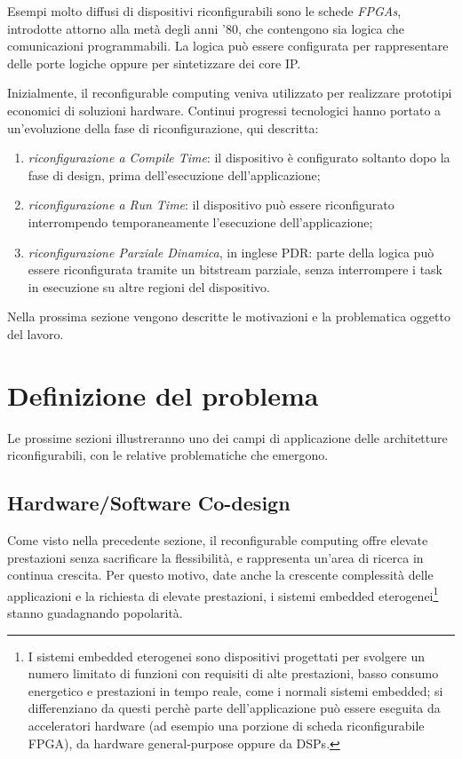Esempi molto diffusi di dispositivi riconfigurabili sono le schede \emph{\acp{FPGA}},
introdotte attorno alla metà degli anni '80, che contengono sia logica che comunicazioni
programmabili. La logica può essere configurata per rappresentare delle porte logiche
oppure per sintetizzare dei core \ac{IP}.

Inizialmente, il reconfigurable computing veniva utilizzato per realizzare prototipi
economici di soluzioni hardware. Continui progressi tecnologici hanno portato
a un'evoluzione della fase di riconfigurazione, qui descritta:
\begin{enumerate}
 \item \emph{riconfigurazione a Compile Time}: il dispositivo è configurato soltanto
dopo la fase di design, prima dell'esecuzione dell'applicazione;
 \item \emph{riconfigurazione a Run Time}: il dispositivo può essere riconfigurato
interrompendo temporaneamente l'esecuzione dell'applicazione;
 \item \emph{riconfigurazione Parziale Dinamica}, in inglese \ac{PDR}: parte della logica
può essere riconfigurata tramite un bitstream parziale, senza interrompere i task in
esecuzione su altre regioni del dispositivo.
\end{enumerate}


Nella prossima sezione vengono descritte le motivazioni e la problematica oggetto del
lavoro.

\section{Definizione del problema}
\label{sec:definizioneProblema}
Le prossime sezioni illustreranno uno dei campi di applicazione delle architetture
riconfigurabili, con le relative problematiche che emergono.

\subsection{Hardware/Software Co-design}
Come visto nella precedente sezione, il reconfigurable computing offre elevate
prestazioni senza sacrificare la flessibilità, e rappresenta un'area di
ricerca in continua crescita. Per questo motivo, date anche la crescente complessità
delle applicazioni e la richiesta di elevate prestazioni, i sistemi embedded
eterogenei\footnote{I sistemi embedded eterogenei sono dispositivi progettati per
svolgere un numero limitato di funzioni con requisiti di alte prestazioni, basso consumo
energetico e prestazioni in tempo reale, come i normali sistemi embedded; si
differenziano da questi perchè parte dell'applicazione può essere eseguita da
acceleratori hardware (ad esempio una porzione di scheda riconfigurabile FPGA), da
hardware general-purpose oppure da \acp{DSP}.} stanno guadagnando popolarità.

